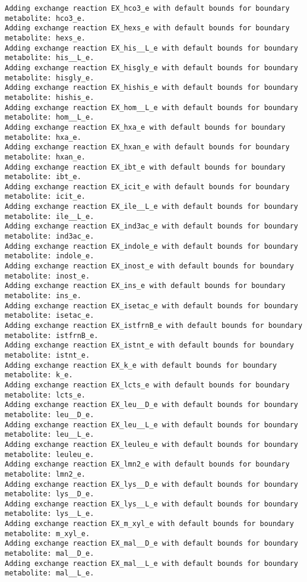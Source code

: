 \documentclass[
  letterpaper,
  DIV=11,
  numbers=noendperiod]{scrartcl}
\begin{document}
\begin{verbatim}
Adding exchange reaction EX_hco3_e with default bounds for boundary metabolite: hco3_e.
Adding exchange reaction EX_hexs_e with default bounds for boundary metabolite: hexs_e.
Adding exchange reaction EX_his__L_e with default bounds for boundary metabolite: his__L_e.
Adding exchange reaction EX_hisgly_e with default bounds for boundary metabolite: hisgly_e.
Adding exchange reaction EX_hishis_e with default bounds for boundary metabolite: hishis_e.
Adding exchange reaction EX_hom__L_e with default bounds for boundary metabolite: hom__L_e.
Adding exchange reaction EX_hxa_e with default bounds for boundary metabolite: hxa_e.
Adding exchange reaction EX_hxan_e with default bounds for boundary metabolite: hxan_e.
Adding exchange reaction EX_ibt_e with default bounds for boundary metabolite: ibt_e.
Adding exchange reaction EX_icit_e with default bounds for boundary metabolite: icit_e.
Adding exchange reaction EX_ile__L_e with default bounds for boundary metabolite: ile__L_e.
Adding exchange reaction EX_ind3ac_e with default bounds for boundary metabolite: ind3ac_e.
Adding exchange reaction EX_indole_e with default bounds for boundary metabolite: indole_e.
Adding exchange reaction EX_inost_e with default bounds for boundary metabolite: inost_e.
Adding exchange reaction EX_ins_e with default bounds for boundary metabolite: ins_e.
Adding exchange reaction EX_isetac_e with default bounds for boundary metabolite: isetac_e.
Adding exchange reaction EX_istfrnB_e with default bounds for boundary metabolite: istfrnB_e.
Adding exchange reaction EX_istnt_e with default bounds for boundary metabolite: istnt_e.
Adding exchange reaction EX_k_e with default bounds for boundary metabolite: k_e.
Adding exchange reaction EX_lcts_e with default bounds for boundary metabolite: lcts_e.
Adding exchange reaction EX_leu__D_e with default bounds for boundary metabolite: leu__D_e.
Adding exchange reaction EX_leu__L_e with default bounds for boundary metabolite: leu__L_e.
Adding exchange reaction EX_leuleu_e with default bounds for boundary metabolite: leuleu_e.
Adding exchange reaction EX_lmn2_e with default bounds for boundary metabolite: lmn2_e.
Adding exchange reaction EX_lys__D_e with default bounds for boundary metabolite: lys__D_e.
Adding exchange reaction EX_lys__L_e with default bounds for boundary metabolite: lys__L_e.
Adding exchange reaction EX_m_xyl_e with default bounds for boundary metabolite: m_xyl_e.
Adding exchange reaction EX_mal__D_e with default bounds for boundary metabolite: mal__D_e.
Adding exchange reaction EX_mal__L_e with default bounds for boundary metabolite: mal__L_e.

\end{verbatim}
\end{document}
